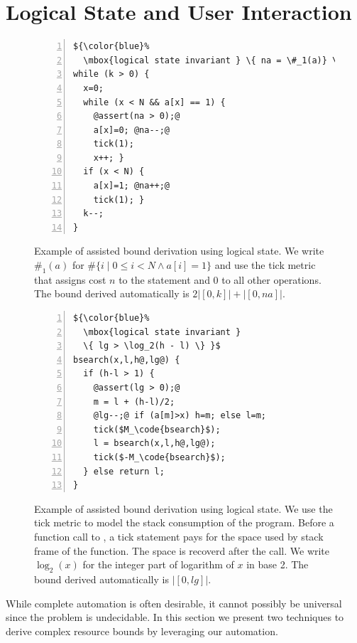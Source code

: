 \documentclass[nocopyrightspace,preprint,pldi]{sigplanconf-pldi15}
\newcommand{\ifshort}[2]{\ifx\fullversion\undefined{#1}\else{#2}\fi}
\newcommand{\sectskip}[0]{\ifshort{\vspace{-3pt}}{}}
\newcommand{\aftersectskip}[0]{\ifshort{\vspace{-1pt}}{}}
\begin{document}




\sectskip
\section{Logical State and User Interaction}
\label{sec:anno}
\aftersectskip

\begin{figure}
\center
\begin{minipage}[b]{0.8\linewidth}
\begin{lstlisting}[numbers=left]
${\color{blue}%
  \mbox{logical state invariant } \{ na = \#_1(a)} \}$
while (k > 0) {
  x=0;
  while (x < N && a[x] == 1) {
    @assert(na > 0);@
    a[x]=0; @na--;@
    tick(1);
    x++; }
  if (x < N) {
    a[x]=1; @na++;@
    tick(1); }
  k--;
}
\end{lstlisting}
\end{minipage}
\caption{Example of assisted bound derivation using logical state.  We write
  $\#_1(a)$ for $\# \{ i \mid 0 \le i < N \land a[i] = 1 \}$ and use the
  tick metric that assigns cost $n$ to the statement  and
  0 to all other operations.  The bound derived automatically is
  $2|[0,k]| + |[0,na]|$.
  }
\label{fig:xmplincaux}
\end{figure}

\begin{figure}
\begin{lstlisting}[numbers=left]
${\color{blue}%
  \mbox{logical state invariant }
  \{ lg > \log_2(h - l) \} }$
bsearch(x,l,h@,lg@) {
  if (h-l > 1) {
    @assert(lg > 0);@
    m = l + (h-l)/2;
    @lg--;@ if (a[m]>x) h=m; else l=m;
    tick($M_\code{bsearch}$);
    l = bsearch(x,l,h@,lg@);
    tick($-M_\code{bsearch}$);
  } else return l;
}
\end{lstlisting}
\caption{Example of assisted bound derivation using logical state.
  We use the tick metric to model the stack consumption of the program.
  Before a function call to , a tick statement pays for
  the space used by stack frame of the function.  The space is recoverd
  after the call.  We write $\log_2(x)$ for the integer part of
  logarithm of $x$ in base 2.
  The bound derived automatically is $|[0,lg]|$.
  }
\label{fig:xmplbsaux}
\end{figure}

While complete automation is often desirable, it cannot possibly
be universal since the problem is undecidable.  In this section
we present two techniques to derive complex resource bounds by
leveraging our automation.
\end{document}
